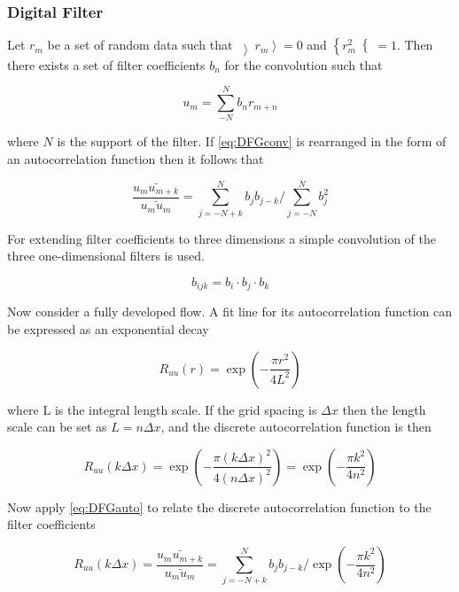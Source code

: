 \subsubsection{Digital Filter}
Let $r_m$ be a set of random data such that $\left\rangle r_m \right\rangle = 0$ and $\left\lbrace r_m^2 \right\lbrace =1$.  Then there exists a set of filter coefficients $b_n$ for the convolution such that

\begin{equation} \label{eq:DFGconv}
u_m = \sum_{-N}^N b_n r_{m+n}
\end{equation}

where $N$ is the support of the filter. If \ref{eq:DFGconv} is rearranged in the form of an autocorrelation function then it follows that

\begin{equation} \label{eq:DFGauto}
\frac{\bar{u_m u_{m+k} } }{ \bar{u_m u_m }  } = \sum_{j=-N+k}^N b_j b_{j-k} \big/ \sum_{j=-N}^N b_j^2
\end{equation}

For extending filter coefficients to three dimensions a simple convolution of the three one-dimensional filters is used.

\begin{equation} \label{eq:DFG3D}
b_{ijk} = b_i \cdot b_j \cdot b_k
\end{equation}

Now consider a fully developed flow.  A fit line for its autocorrelation function can be expressed as an exponential decay

\begin{equation}
R_{uu} (r) = \exp \left( - \frac{ \pi r^2}{4 L^2} \right)
\end{equation}

where L is the integral length scale. If the grid spacing is $\Delta x$ then the length scale can be set as $L = n \Delta x$, and the discrete autocorrelation function is then

\begin{equation}
R_{uu} ( k \Delta x) = \exp \left( - \frac{ \pi (k \Delta x)^2}{4 (n \Delta x)^2} \right) = \exp \left( - \frac{ \pi k^2}{4 n^2} \right)
\end{equation}

Now apply \ref{eq:DFGauto} to relate the discrete autocorrelation function to the filter coefficients

\begin{equation}
R_{uu} (k \Delta x) = \frac{ \bar{ u_m u_{m+k} } }{ \bar{u_m u_m} } = \sum_{j=-N+k}^N b_j b_{j-k} \big/ \exp \left( - \frac{ \pi k^2}{4 n^2} \right)
\end{equation}

